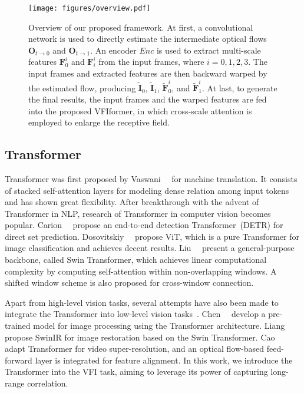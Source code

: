 \documentclass[10pt,twocolumn,letterpaper]{article}
\begin{document}
	\begin{figure*}[t]
		\begin{center}
			\texttt{[image: figures/overview.pdf]}
		\end{center}
\caption{Overview of our proposed framework. At first, a convolutional network is used to directly estimate the intermediate optical flows $\bm{O}_{t\rightarrow0}$ and $\bm{O}_{t\rightarrow1}$. An encoder $Enc$ is used to extract multi-scale features $\bm{F}_0^i$ and $\bm{F}_i^i$ from the input frames, where $i=0,1,2,3$. The input frames and extracted features are then backward warped by the estimated flow, producing $\widetilde{\bm{I}}_{0}$, $\widetilde{\bm{I}}_{1}$, $\widetilde{\bm{F}}_{0}^{i}$, and $\widetilde{\bm{F}}_{1}^{i}$. At last, to generate the final results, the input frames and the warped features are fed into the proposed VFIformer, in which cross-scale attention is employed to enlarge the receptive field.}
		\label{fig:overview}
	\end{figure*}
	
	
	\subsection{Transformer}
	
	Transformer was first proposed by Vaswani~\etal~\cite{vaswani2017attention} for machine translation. It consists of stacked self-attention layers for modeling dense relation among input tokens and has shown great flexibility. After breakthrough with the advent of Transformer in NLP, research of Transformer in computer vision becomes popular. Carion~\etal~\cite{carion2020end} propose an end-to-end detection Transformer~(DETR) for direct set prediction. Dosovitskiy~\etal~\cite{dosovitskiy2020image} propose ViT, which is a pure Transformer for image classification and achieves decent results. Liu~\etal~\cite{liu2021swin} present a general-purpose backbone, called Swin Transformer, which achieves linear computational complexity by computing self-attention within non-overlapping windows. A shifted window scheme is also proposed for cross-window connection. 
	
	Apart from high-level vision tasks, several attempts have also been made to integrate the Transformer into low-level vision tasks~\cite{ttsr,cao2021video,chen2021pre,liang2021swinir}. Chen~\etal~\cite{chen2021pre} develop a pre-trained model for image processing using the Transformer architecture. Liang~\etal~\cite{liang2021swinir} propose SwinIR for image restoration based on the Swin Transformer. Cao~\etal~\cite{cao2021video} adapt Transformer for video super-resolution, and an optical flow-based feed-forward layer is integrated for feature alignment. In this work, we introduce the Transformer into the VFI task, aiming to leverage its power of capturing long-range correlation.
	
\end{document}
